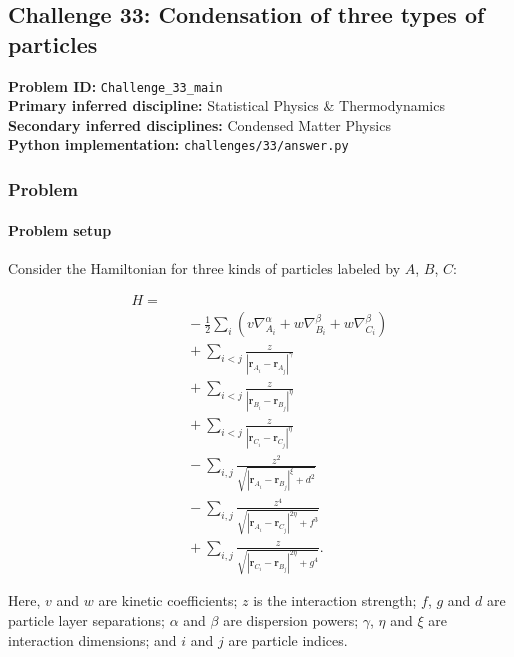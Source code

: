 \subsection[Challenge 33: Condensation of three types of particles]{Challenge 33: Condensation of three types of particles}
\textbf{Problem ID:} \texttt{Challenge\_33\_main}\\
\textbf{Primary inferred discipline:} Statistical Physics \& Thermodynamics\\
\textbf{Secondary inferred disciplines:} Condensed Matter Physics\\
\textbf{Python implementation:} \texttt{challenges/33/answer.py}

\subsubsection*{Problem}
\paragraph*{Problem setup}

Consider the Hamiltonian for three kinds of particles labeled by $A$, $B$, $C$:

\[
\begin{aligned}
H ={}&  \\
&\quad -\frac{1}{2} \sum_i \left( v\nabla_{A_i}^{\alpha} + w\nabla_{B_i}^{\beta} + w\nabla_{C_i}^{\beta} \right) \\
&\quad + \sum_{i<j} \frac{z}{|\mathbf{r}_{A_i} - \mathbf{r}_{A_j}|^{\gamma}} \\
&\quad + \sum_{i<j} \frac{z}{|\mathbf{r}_{B_i} - \mathbf{r}_{B_j}|^{\eta}} \\
&\quad + \sum_{i<j} \frac{z}{|\mathbf{r}_{C_i} - \mathbf{r}_{C_j}|^{\eta}} \\
&\quad - \sum_{i,j} \frac{z^2}{\sqrt{|\mathbf{r}_{A_i} - \mathbf{r}_{B_j}|^{\xi} + d^2}} \\
&\quad - \sum_{i,j} \frac{z^4}{\sqrt{|\mathbf{r}_{A_i} - \mathbf{r}_{C_j}|^{2\eta} + f^3}} \\
&\quad + \sum_{i,j} \frac{z}{\sqrt{|\mathbf{r}_{C_i} - \mathbf{r}_{B_j}|^{2\eta} + g^4}}.
\end{aligned}
\]

Here, $v$ and $w$ are kinetic coefficients; $z$ is the interaction strength; $f$, $g$ and $d$ are particle layer separations; $\alpha$ and $\beta$ are dispersion powers; $\gamma$, $\eta$ and $\xi$ are interaction dimensions; and $i$ and $j$ are particle indices.

